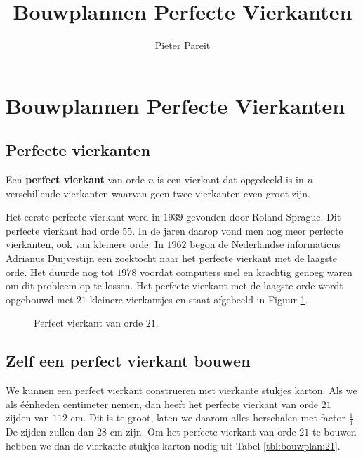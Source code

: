 \documentclass[10pt]{article}
\title{Bouwplannen Perfecte Vierkanten}
\author{Pieter Pareit}
\begin{document}
\section*{Bouwplannen Perfecte Vierkanten}

\subsection*{Perfecte vierkanten}

Een {\bf perfect vierkant} van orde $n$ is een vierkant dat opgedeeld is in $n$ verschillende vierkanten waarvan geen twee vierkanten even groot zijn.

Het eerste perfecte vierkant werd in $1939$ gevonden door Roland Sprague. Dit perfecte vierkant had orde $55$. In de jaren daarop vond men nog meer perfecte vierkanten, ook van kleinere orde. In $1962$ begon de Nederlandse informaticus Adrianus Duijvestijn een zoektocht naar het perfecte vierkant met de laagste orde. Het duurde nog tot $1978$ voordat computers snel en krachtig genoeg waren om dit probleem op te lossen. Het perfecte vierkant met de laagste orde wordt opgebouwd met $21$ kleinere vierkantjes en staat afgebeeld in Figuur \ref{fig:pv21}.

\begin{figure}[ht]
  \centering
  
  \caption{Perfect vierkant van orde $21$.}
  \label{fig:pv21}
\end{figure}

\subsection*{Zelf een perfect vierkant bouwen}

We kunnen een perfect vierkant construeren met vierkante stukjes karton. Als we als éénheden centimeter nemen, dan heeft het perfecte vierkant van orde $21$ zijden van $112$ cm. Dit is te groot, laten we daarom alles herschalen met factor $\frac{1}{4}$. De zijden zullen dan $28$ cm zijn. Om het perfecte vierkant van orde $21$ te bouwen hebben we dan de vierkante stukjes karton nodig uit Tabel \ref{tbl:bouwplan:21}.
\end{document}
